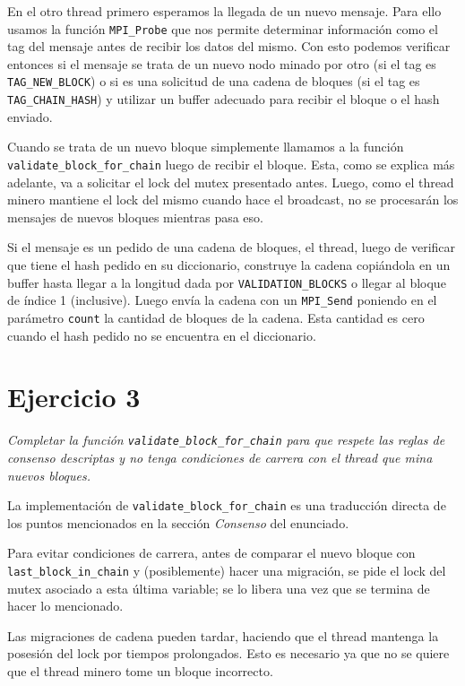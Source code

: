 En el otro thread primero esperamos la llegada de un nuevo mensaje. Para ello usamos la función \texttt{MPI\_Probe} que nos permite determinar información como el tag del mensaje antes de recibir los datos del mismo. Con esto podemos verificar entonces si el mensaje se trata de un nuevo nodo minado por otro (si el tag es \texttt{TAG\_NEW\_BLOCK}) o si es una solicitud de una cadena de bloques (si el tag es \texttt{TAG\_CHAIN\_HASH}) y utilizar un buffer adecuado para recibir el bloque o el hash enviado.

Cuando se trata de un nuevo bloque simplemente llamamos a la función \texttt{validate\_block\_for\_chain} luego de recibir el bloque. Esta, como se explica más adelante, va a solicitar el lock del mutex presentado antes. Luego, como el thread minero mantiene el lock del mismo cuando hace el broadcast, no se procesarán los mensajes de nuevos bloques mientras pasa eso.

Si el mensaje es un pedido de una cadena de bloques, el thread, luego de verificar que tiene el hash pedido en su diccionario, construye la cadena copiándola en un buffer hasta llegar a la longitud dada por \texttt{VALIDATION\_BLOCKS} o llegar al bloque de índice 1 (inclusive). Luego envía la cadena con un \texttt{MPI\_Send} poniendo en el parámetro \texttt{count} la cantidad de bloques de la cadena. Esta cantidad es cero cuando el hash pedido no se encuentra en el diccionario.


\section{Ejercicio 3}

\emph{Completar la función \texttt{validate\_block\_for\_chain} para que respete las reglas de consenso descriptas y no tenga condiciones de carrera con el thread que mina nuevos bloques.}

La implementación de \texttt{validate\_block\_for\_chain} es una traducción directa de los puntos mencionados en la sección \emph{Consenso} del enunciado.

Para evitar condiciones de carrera, antes de comparar el nuevo bloque con \texttt{last\_block\_in\_chain} y (posiblemente) hacer una migración, se pide el lock del mutex asociado a esta última variable; se lo libera una vez que se termina de hacer lo mencionado.

Las migraciones de cadena pueden tardar, haciendo que el thread mantenga la posesión del lock por tiempos prolongados. Esto es necesario ya que no se quiere que el thread minero tome un bloque incorrecto.

